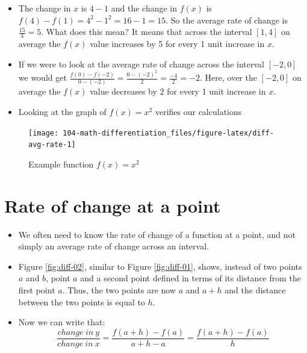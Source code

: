 \documentclass[
]{book}
\providecommand{\tightlist}{%
  \setlength{\itemsep}{0pt}\setlength{\parskip}{0pt}}
\theoremstyle{definition}
\theoremstyle{definition}
\theoremstyle{definition}
\theoremstyle{remark}
\begin{document}
\begin{itemize}
\tightlist
\item
  The change in \(x\) is \(4-1\) and the change in \(f(x)\) is \(f(4) - f(1) = 4^2 -1^2 = 16 - 1 = 15\). So the average rate of change is \(\frac{15}{3}=5\). What does this mean? It means that across the interval \([1,4]\) on average the \(f(x)\) value increases by 5 for every 1 unit increase in \(x\).
\item
  If we were to look at the average rate of change across the interval \([-2, 0]\) we would get \(\frac{f(0)-f(-2)}{0 - (-2)}=\frac{0 - (-2)^2}{2}=\frac{-4}{2} = -2\). Here, over the \([-2, 0]\) on average the \(f(x)\) value decreases by 2 for every 1 unit increase in \(x\).
\item
  Looking at the graph of \(f(x)=x^2\) verifies our calculations
\end{itemize}

\begin{figure}

{\centering \texttt{[image: 104-math-differentiation\_files/figure-latex/diff-avg-rate-1]} 

}

\caption{Example function $f(x) = x^2$}\label{fig:diff-avg-rate}
\end{figure}

\hypertarget{rate-of-change-at-a-point}{%
\section{Rate of change at a point}\label{rate-of-change-at-a-point}}

\begin{itemize}
\tightlist
\item
  We often need to know the rate of change of a function at a point, and not simply an average rate of change across an interval.
\item
  Figure \ref{fig:diff-02}, similar to Figure \ref{fig:diff-01}, shows, instead of two points \(a\) and \(b\), point \(a\) and a second point defined in terms of its distance from the first point \(a\). Thus, the two points are now \(a\) and \(a + h\) and the distance between the two points is equal to \(h\).
\item
  Now we can write that:
  \[\frac{change\:in\:y}{change\:in\:x}=\frac{f(a+h)-f(a)}{a+h-a} = \frac{f(a+h)-f(a)}{h}\]
\end{itemize}
\end{document}
